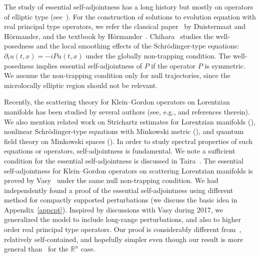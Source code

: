 \documentclass[10pt]{amsart}
\theoremstyle{definition}
\newcommand*\re{\mathbb{R}}
\newcommand*\pa{\partial}
\begin{document}
The study of essential self-adjointness has a long history but mostly on operators of elliptic type (see~\cite[Chapter~X and reference therein]{RS}). For the construction of solutions to evolution equation with real principal type operators, we refer the classical paper~\cite{DH} by Duistermaat and H\"ormander, and the textbook by H\"ormander~\cite{Ho}. Chihara~\cite{C} studies the well-posedness and the local smoothing effects of the Schr\"odinger-type equations: $\pa_t u(t,x)=-iPu(t,x)$ under the globally non-trapping condition. The well-posedness implies essential self-adjointness of $P$ if the operator $P$ is symmetric. We assume the non-trapping condition only for null trajectories, since the microlocally elliptic region should not be relevant.

Recently, the scattering theory for Klein--Gordon operators on Lorentzian manifolds has been studied by several authors (see, e.g., \cite{BV,GNV,Va1} and references therein). We also mention related work on Strichartz estimates for Lorentzian manifolds (\cite{GT, MT, Taira}), nonlinear Schr\"odinger-type equations with Minkowski metric (\cite{GS, S, W}), and quantum field theory on Minkowski spaces (\cite{GW,VW}). In order to study spectral properties of such equations or operators, self-adjointness is fundamental. We note a sufficient condition for the essential self-adjointness is discussed in Taira~\cite{Taira}. The essential self-adjointness for Klein--Gordon operators on scattering Lorentzian manifolds is proved by Vasy~\cite{Va1} under the same null non-trapping condition. We had independently found a proof of the essential self-adjointness using different method for compactly supported perturbations (we discuss the basic idea in Appendix~\ref{appcpt}). Inspired by discussions with Vasy during 2017, we generalized the model to include long-range perturbations, and also to higher order real principal type operators. Our proof is considerably different from~\cite{Va1}, relatively self-contained, and hopefully simpler even though our result is more general than~\cite{Va1} for the $\re^n$ case.
\end{document}
